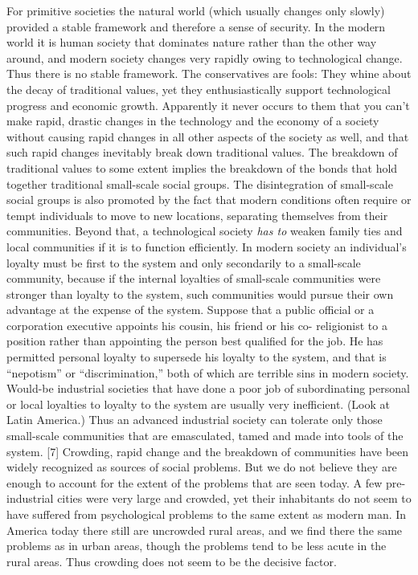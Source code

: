  For primitive societies the natural world (which usually changes only slowly) provided a stable framework and therefore a sense of security. In the modern world it is human society that dominates nature rather than the other way around, and modern society changes very rapidly owing to technological change. Thus there is no stable framework.
 The conservatives are fools: They whine about the decay of traditional values, yet they enthusiastically support technological progress and economic growth. Apparently it never occurs to them that you can’t make rapid, drastic changes in the technology and the economy of a society without causing rapid changes in all other aspects of the society as well, and that such rapid changes inevitably break down traditional values.
 The breakdown of traditional values to some extent implies the breakdown of the bonds that hold together traditional small-scale social groups. The disintegration of small-scale social groups is also promoted by the fact that modern conditions often require or tempt individuals to move to new locations, separating themselves from their communities. Beyond that, a technological society {\em has to} weaken family ties and local communities if it is to function efficiently. In modern society an individual’s loyalty must be first to the system and only secondarily to a small-scale community, because if the internal loyalties of small-scale communities were stronger than loyalty to the system, such communities would pursue their own advantage at the expense of the system.\break
{} Suppose that a public official or a corporation executive appoints his cousin, his friend or his co- religionist to a position rather than appointing the person best qualified for the job. He has permitted personal loyalty to supersede his loyalty to the system, and that is “nepotism” or “discrimination,” both of which are terrible sins in modern society. Would-be industrial societies that have done a poor job of subordinating personal or local loyalties to loyalty to the system are usually very inefficient. (Look at Latin America.) Thus an advanced industrial society can tolerate only those small-scale communities that are emasculated, tamed and made into tools of the system. [7]
 Crowding, rapid change and the breakdown of communities have been widely recognized as sources of social problems. But we do not believe they are enough to account for the extent of the problems that are seen today.
 A few pre-industrial cities were very large and crowded, yet their inhabitants do not seem to have suffered from psychological problems to the same extent as modern man. In America today there still are uncrowded rural areas, and we find there the same problems as in urban areas, though the problems tend to be less acute in the rural areas. Thus crowding does not seem to be the decisive factor.
